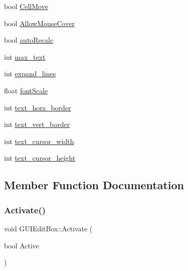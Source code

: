 \begin{DoxyCompactItemize}
\item 
bool \hyperlink{class_g_u_i_edit_box_ac26a470c43656f8adb322e4439c55f68}{Cell\+Move}
\item 
bool \hyperlink{class_g_u_i_edit_box_a622aab637b11e4d3b4b1eba252f267a6}{Allow\+Mouse\+Cover}
\item 
bool \hyperlink{class_g_u_i_edit_box_a6e414e33dd484aecf37e65f093092be0}{auto\+Recalc}
\item 
int \hyperlink{class_g_u_i_edit_box_a0b769d15a7218c107f8607b9a0902ce2}{max\+\_\+text}
\item 
int \hyperlink{class_g_u_i_edit_box_acddc6998ac50301e0d5752424f889a30}{expand\+\_\+lines}
\item 
float \hyperlink{class_g_u_i_edit_box_adb781f6b13eb6614ada65ed4c94a5df1}{font\+Scale}
\item 
int \hyperlink{class_g_u_i_edit_box_a4d838f8c430f9cf27bf4feb6bf7fb584}{text\+\_\+horz\+\_\+border}
\item 
int \hyperlink{class_g_u_i_edit_box_af74398da43c74b71787e542764696897}{text\+\_\+vert\+\_\+border}
\item 
int \hyperlink{class_g_u_i_edit_box_abb2b0ba37187b76bdb8b28f27e9abcfa}{text\+\_\+cursor\+\_\+width}
\item 
int \hyperlink{class_g_u_i_edit_box_a387e53699ca99d8e70f050c757e34cf7}{text\+\_\+cursor\+\_\+height}
\end{DoxyCompactItemize}


\subsection{Member Function Documentation}
\hypertarget{class_g_u_i_edit_box_a6a66f7950e739733ab8b24bef783eca1}{}\label{class_g_u_i_edit_box_a6a66f7950e739733ab8b24bef783eca1} 
\subsubsection{\texorpdfstring{Activate()}{Activate()}}
{\footnotesize\ttfamily void G\+U\+I\+Edit\+Box\+::\+Activate (\begin{DoxyParamCaption}\item[{bool}]{Active }\end{DoxyParamCaption})}

\hypertarget{class_g_u_i_edit_box_a04246e48c971025bab5810eddb463b32}{}\label{class_g_u_i_edit_box_a04246e48c971025bab5810eddb463b32} 
